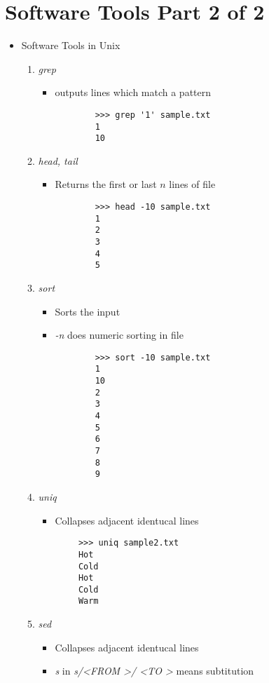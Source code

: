 \documentclass[12pt]{article}
\begin{document}
\section*{Software Tools Part 2 of 2}
\begin{itemize}
    \item Software Tools in Unix
    \begin{enumerate}[1.]
        \item \textit{grep}
        \begin{itemize}
        \item outputs lines which match a pattern

        \begin{lstlisting}
        >>> grep '1' sample.txt
        1
        10
        \end{lstlisting}
        \end{itemize}

        \item \textit{head, tail}
        \begin{itemize}
        \item Returns the first or last $n$ lines of file

        \begin{lstlisting}
        >>> head -10 sample.txt
        1
        2
        3
        4
        5
        \end{lstlisting}

        \end{itemize}

        \item \textit{sort}
        \begin{itemize}
            \item Sorts the input
            \item \textit{-n} does numeric sorting in file
        \begin{lstlisting}
        >>> sort -10 sample.txt
        1
        10
        2
        3
        4
        5
        6
        7
        8
        9
        \end{lstlisting}

        \end{itemize}
        \item \textit{uniq}
        \begin{itemize}
            \item Collapses adjacent identucal lines
        \end{itemize}
        \begin{lstlisting}
        >>> uniq sample2.txt
        Hot
        Cold
        Hot
        Cold
        Warm
        \end{lstlisting}
        \item \textit{sed}
        \begin{itemize}
            \item Collapses adjacent identucal lines
            \item \textit{s} in \textit{s/\textless FROM \textgreater/ \textless TO \textgreater} means subtitution
        \end{itemize}


\end{enumerate}
\end{itemize}
\end{document}

